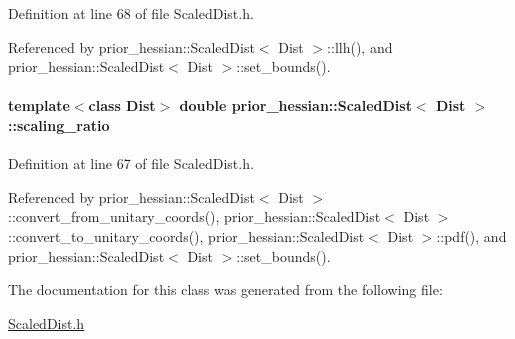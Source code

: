 Definition at line 68 of file Scaled\+Dist.\+h.



Referenced by prior\+\_\+hessian\+::\+Scaled\+Dist$<$ Dist $>$\+::llh(), and prior\+\_\+hessian\+::\+Scaled\+Dist$<$ Dist $>$\+::set\+\_\+bounds().

\paragraph[{\texorpdfstring{scaling\+\_\+ratio}{scaling_ratio}}]{\setlength{\rightskip}{0pt plus 5cm}template$<$class Dist$>$ double {\bf prior\+\_\+hessian\+::\+Scaled\+Dist}$<$ Dist $>$\+::scaling\+\_\+ratio\hspace{0.3cm}{\ttfamily [protected]}}\hypertarget{classprior__hessian_1_1ScaledDist_a27f94c682e78e310b0820008d723fa95}{}\label{classprior__hessian_1_1ScaledDist_a27f94c682e78e310b0820008d723fa95}


Definition at line 67 of file Scaled\+Dist.\+h.



Referenced by prior\+\_\+hessian\+::\+Scaled\+Dist$<$ Dist $>$\+::convert\+\_\+from\+\_\+unitary\+\_\+coords(), prior\+\_\+hessian\+::\+Scaled\+Dist$<$ Dist $>$\+::convert\+\_\+to\+\_\+unitary\+\_\+coords(), prior\+\_\+hessian\+::\+Scaled\+Dist$<$ Dist $>$\+::pdf(), and prior\+\_\+hessian\+::\+Scaled\+Dist$<$ Dist $>$\+::set\+\_\+bounds().



The documentation for this class was generated from the following file\+:\begin{DoxyCompactItemize}
\item 
\hyperlink{ScaledDist_8h}{Scaled\+Dist.\+h}\end{DoxyCompactItemize}
